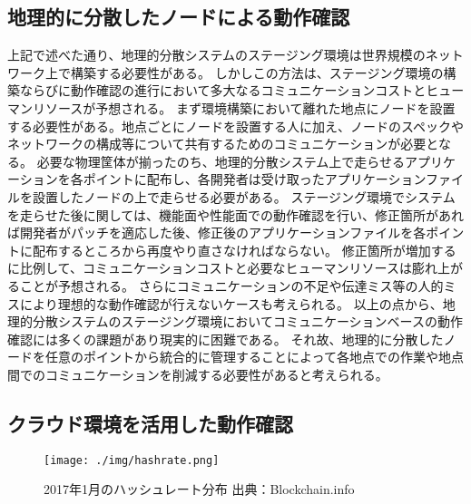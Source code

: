 \subsection{地理的に分散したノードによる動作確認}
上記で述べた通り、地理的分散システムのステージング環境は世界規模のネットワーク上で構築する必要性がある。
しかしこの方法は、ステージング環境の構築ならびに動作確認の進行において多大なるコミュニケーションコストとヒューマンリソースが予想される。
まず環境構築において離れた地点にノードを設置する必要性がある。地点ごとにノードを設置する人に加え、ノードのスペックやネットワークの構成等について共有するためのコミュニケーションが必要となる。
必要な物理筐体が揃ったのち、地理的分散システム上で走らせるアプリケーションを各ポイントに配布し、各開発者は受け取ったアプリケーションファイルを設置したノードの上で走らせる必要がある。
ステージング環境でシステムを走らせた後に関しては、機能面や性能面での動作確認を行い、修正箇所があれば開発者がパッチを適応した後、修正後のアプリケーションファイルを各ポイントに配布するところから再度やり直さなければならない。
修正箇所が増加するに比例して、コミュニケーションコストと必要なヒューマンリソースは膨れ上がることが予想される。
さらにコミュニケーションの不足や伝達ミス等の人的ミスにより理想的な動作確認が行えないケースも考えられる。
以上の点から、地理的分散システムのステージング環境においてコミュニケーションベースの動作確認には多くの課題があり現実的に困難である。
それ故、地理的に分散したノードを任意のポイントから統合的に管理することによって各地点での作業や地点間でのコミュニケーションを削減する必要性があると考えられる。

\subsection{}

\subsection{クラウド環境を活用した動作確認}

\begin{figure}[h]
    \begin{center}
        \texttt{[image: ./img/hashrate.png]}
        \caption{2017年1月のハッシュレート分布 出典：Blockchain.info\cite{bitcoinhashrate}}
        \label{img:hashrate}
    \end{center}
\end{figure}
\fi
